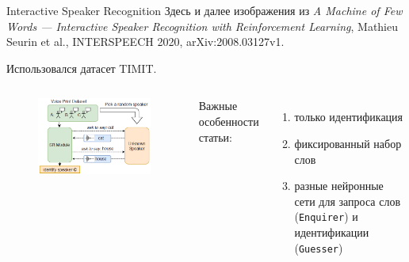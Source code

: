 \documentclass[aspectratio=43]{beamer}
\newcommand{\guesser}{\texttt{Guesser}}
\newcommand{\enquirer}{\texttt{Enquirer}}
\begin{document}
\begin{frame}{}
    
\end{frame}

\begin{frame}{Interactive Speaker Recognition}
    Здесь и далее изображения из \textit{A Machine of Few Words --- Interactive
    Speaker Recognition with Reinforcement Learning}, Mathieu Seurin et al.,
    INTERSPEECH 2020, arXiv:2008.03127v1.\vspace{1em}

    Использовался датасет TIMIT\@.

    \begin{columns}

    \begin{figure}[bht]
        \includegraphics[width=.9\textwidth]{isr_game_large.png}
    \end{figure}

    Важные особенности статьи:
    \begin{enumerate}
        \item только идентификация
        \item фиксированный набор слов
        \item разные нейронные сети для запроса слов (\enquirer) и идентификации (\guesser)
    \end{enumerate}

    \end{columns}
\end{frame}
\end{document}
